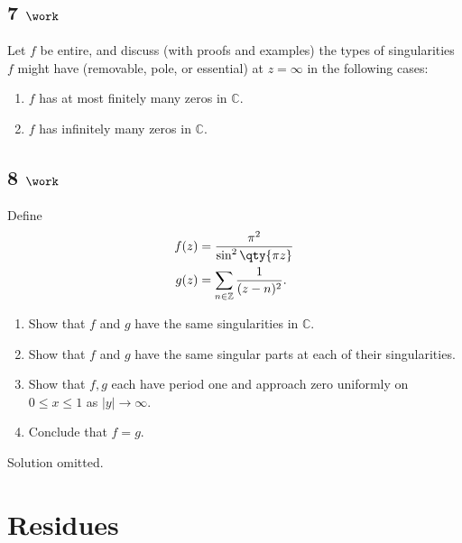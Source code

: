 \hypertarget{work-34}{%
\subsection{\texorpdfstring{7
\(\work\)}{7 \textbackslash work}}\label{work-34}}

Let \(f\) be entire, and discuss (with proofs and examples) the types of
singularities \(f\) might have (removable, pole, or essential) at
\(z=\infty\) in the following cases:

\begin{enumerate}
\def\labelenumi{\arabic{enumi}.}
\tightlist
\item
  \(f\) has at most finitely many zeros in \({\mathbb{C}}\).
\item
  \(f\) has infinitely many zeros in \({\mathbb{C}}\).
\end{enumerate}

\hypertarget{work-35}{%
\subsection{\texorpdfstring{8
\(\work\)}{8 \textbackslash work}}\label{work-35}}

Define
\begin{align*}
f(z) &= {\pi^2 \over \sin^2 \qty{\pi z} } \\
g(z) &= \sum_{n\in {\mathbb{Z}}} {1\over (z-n)^2}
.\end{align*}

\begin{enumerate}
\def\labelenumi{\alph{enumi}.}
\tightlist
\item
  Show that \(f\) and \(g\) have the same singularities in
  \({\mathbb{C}}\).
\item
  Show that \(f\) and \(g\) have the same singular parts at each of
  their singularities.
\item
  Show that \(f, g\) each have period one and approach zero uniformly on
  \(0\leq x \leq 1\) as \({\left\lvert {y} \right\rvert}\to \infty\).
\item
  Conclude that \(f = g\).
\end{enumerate}


Solution omitted.

\hypertarget{residues}{%
\section{Residues}\label{residues}}

